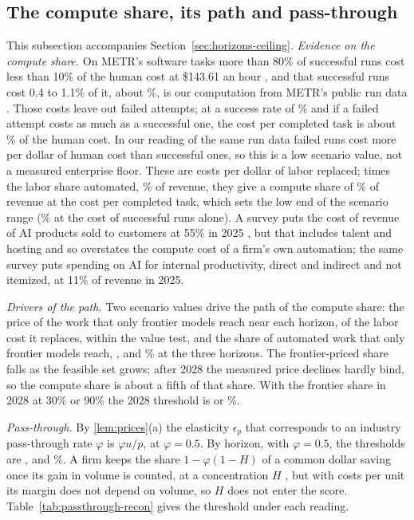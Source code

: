 \subsection{The compute share, its path and pass-through}\label{supp:model-compute}
This subsection accompanies Section~\ref{sec:horizons-ceiling}. \emph{Evidence on the compute share.} On METR's software tasks more than 80\% of successful runs cost less than 10\% of the human cost at \$143.61 an hour \citep[Figure~14]{kwa2025measuring}, and that successful runs cost 0.4 to 1.1\% of it, about \KappaLoRuns\%, is our computation from METR's public run data \citep{metr2026evalanalysis}. Those costs leave out failed attempts; at a success rate of \CcSuccessRate\% and if a failed attempt costs as much as a successful one, the cost per completed task is about \KappaLo\% of the human cost. In our reading of the same run data failed runs cost more per dollar of human cost than successful ones, so this is a low scenario value, not a measured enterprise floor. These are costs per dollar of labor replaced; times the labor share automated, \CcLaborShare\% of revenue, they give a compute share of \CcLo\% of revenue at the cost per completed task, which sets the low end of the scenario range (\CcLoRuns\% at the cost of successful runs alone). A survey puts the cost of revenue of AI products sold to customers at 55\% in 2025 \citep{iconiq2026state}, but that includes talent and hosting and so overstates the compute cost of a firm's own automation; the same survey puts spending on AI for internal productivity, direct and indirect and not itemized, at 11\% of revenue in 2025.

\emph{Drivers of the path.} Two scenario values drive the path of the compute share: the price of the work that only frontier models reach near each horizon, \CcKappaFront{} of the labor cost it replaces, within the value test, and the share of automated work that only frontier models reach, \CcOmegaTwentyEight, \CcOmegaThirtyOne{} and \CcOmegaThirtySix\% at the three horizons. The frontier-priced share falls as the feasible set grows; after 2028 the measured price declines hardly bind, so the compute share is about a fifth of that share. With the frontier share in 2028 at 30\% or 90\% the 2028 threshold is \GstarOmegaLoTwentyEight{} or \GstarOmegaHiTwentyEight\%.

\emph{Pass-through.} By \autoref{lem:prices}(a) the elasticity $\epsilon_p$ that corresponds to an industry pass-through rate $\varphi$ is $\varphi u/p$, \PtElasHalf{} at $\varphi=0.5$. By horizon, with $\varphi=0.5$, the thresholds are \GstarPhiHalfTwentyEight, \GstarPhiHalfThirtyOne{} and \GstarPhiHalfThirtySix\%. A firm keeps the share $1-\varphi(1-H)$ of a common dollar saving once its gain in volume is counted, at a concentration $H$ \citep{murthy2026transformation}, but with costs per unit its margin does not depend on volume, so $H$ does not enter the score. Table~\ref{tab:passthrough-recon} gives the threshold under each reading.

